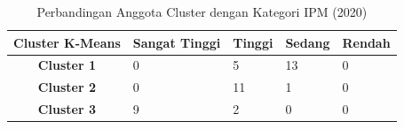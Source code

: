 \begin{table}[H]
\centering
\caption{Perbandingan Anggota Cluster dengan Kategori IPM (2020)} \label{tab:ipm_cross_2020}
\begin{tabular}{|c|p{2cm}|p{2cm}|p{2cm}|p{2cm}|}
\hline
\textbf{Cluster K-Means} & \textbf{Sangat Tinggi} & \textbf{Tinggi} & \textbf{Sedang} & \textbf{Rendah} \\ \hline
\textbf{Cluster 1} & 0 & 5 & 13 & 0 \\ \hline
\textbf{Cluster 2} & 0 & 11 & 1 & 0 \\ \hline
\textbf{Cluster 3} & 9 & 2 & 0 & 0 \\ \hline
\end{tabular}
\end{table}